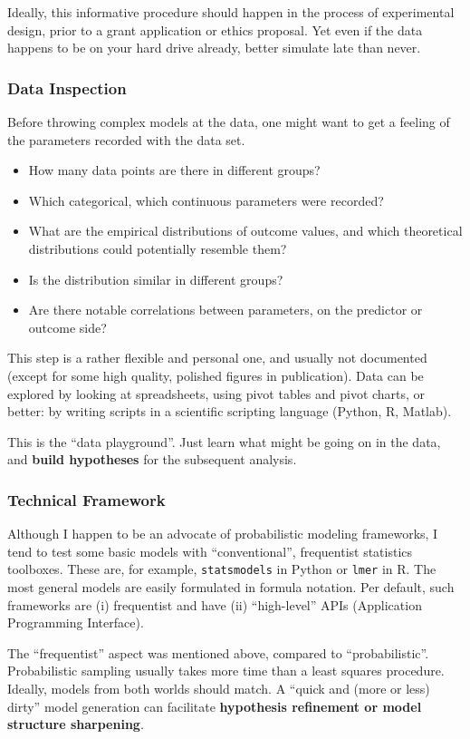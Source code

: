 Ideally, this informative procedure should happen in the process of experimental design, prior to a grant application or ethics proposal.
Yet even if the data happens to be on your hard drive already, better simulate late than never.


\subsubsection{Data Inspection}
\label{sec:orga128476}
Before throwing complex models at the data, one might want to get a feeling of the parameters recorded with the data set.
\begin{itemize}
\item How many data points are there in different groups?
\item Which categorical, which continuous parameters were recorded?
\item What are the empirical distributions of outcome values, and which theoretical distributions could potentially resemble them?
\item Is the distribution similar in different groups?
\item Are there notable correlations between parameters, on the predictor or outcome side?
\end{itemize}

This step is a rather flexible and personal one, and usually not documented (except for some high quality, polished figures in publication).
Data can be explored by looking at spreadsheets, using pivot tables and pivot charts, or better: by writing scripts in a scientific scripting language (Python, R, Matlab).

This is the ``data playground''.
Just learn what might be going on in the data, and \textbf{build hypotheses} for the subsequent analysis.


\subsubsection{Technical Framework}
\label{workflow:framework}
Although I happen to be an advocate of probabilistic modeling frameworks, I tend to test some basic models with ``conventional'', frequentist statistics toolboxes.
These are, for example, \texttt{statsmodels} in Python or \texttt{lmer} in R.
The most general models are easily formulated in formula notation.
Per default, such frameworks are (i) frequentist and have (ii) ``high-level'' APIs (Application Programming Interface).

The ``frequentist'' aspect was mentioned above, compared to ``probabilistic''.
Probabilistic sampling usually takes more time than a least squares procedure.
Ideally, models from both worlds should match.
A ``quick and (more or less) dirty'' model generation can facilitate \textbf{hypothesis refinement or model structure sharpening}.

